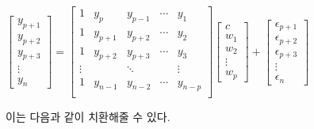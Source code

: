 \documentclass[manuscript,screen,review]{acmart}
\begin{document}
\begin{math}
  \begin{bmatrix}
  y_{p+1} \\ y_{p+2} \\ y_{p+3} \\ \vdots \\ y_{n}
  \end{bmatrix}
  = 
  \begin{bmatrix}
  1 & y_{p} & y_{p-1} & \cdots & y_{1} \\
  1 & y_{p+1} & y_{p+2} & \cdots & y_{2} \\
  1 & y_{p+2} & y_{p+3} & \cdots & y_{3} \\
  \vdots &  & \ddots & & \vdots \\
  1 & y_{n-1} & y_{n-2} & \cdots & y_{n-p} \\
  \end{bmatrix}
  \begin{bmatrix}
  c \\ w_1 \\ w_2 \\ \vdots \\ w_p
  \end{bmatrix}
  +
  \begin{bmatrix}
  \epsilon_{p+1} \\ \epsilon_{p+2} \\ \epsilon_{p+3} \\ \vdots \\ \epsilon_n
  \end{bmatrix}
\end{math}

이는 다음과 같이 치환해줄 수 있다.
\end{document}
